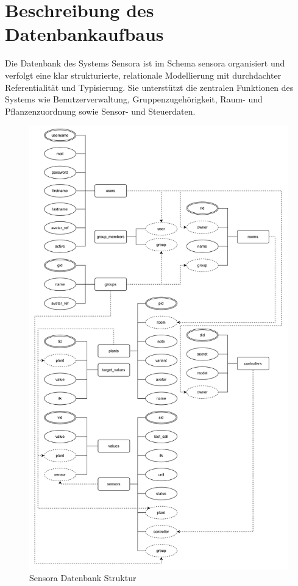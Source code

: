 \section{Beschreibung des Datenbankaufbaus}
Die Datenbank des Systems Sensora ist im Schema sensora organisiert und verfolgt eine klar strukturierte, relationale Modellierung mit durchdachter Referentialität und Typisierung. Sie unterstützt die zentralen Funktionen des Systems wie Benutzerverwaltung, Gruppenzugehörigkeit, Raum- und Pflanzenzuordnung sowie Sensor- und Steuerdaten.
\newpage
\begin{figure}[H]
\centering
%  
  \includegraphics[width=\linewidth, height=0.9\textheight]{img/Datenbank Diagramm.png}
\caption{Sensora Datenbank Struktur}
\label{fig:sensora_datenbank}
\end{figure}
\newpage

